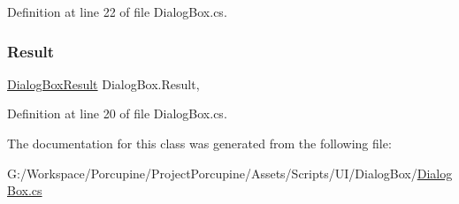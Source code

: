 Definition at line 22 of file Dialog\+Box.\+cs.

\mbox{\label{class_dialog_box_a6b1266a48b4fc7ca5d8b68b62310601d}} 
\subsubsection{\texorpdfstring{Result}{Result}}
{\footnotesize\ttfamily \hyperlink{_dialog_box_result_8cs_acd933b66f7b1c8ad36ee61780622c54f}{Dialog\+Box\+Result} Dialog\+Box.\+Result\hspace{0.3cm}{\ttfamily [get]}, {\ttfamily [set]}}



Definition at line 20 of file Dialog\+Box.\+cs.



The documentation for this class was generated from the following file\+:\begin{DoxyCompactItemize}
\item 
G\+:/\+Workspace/\+Porcupine/\+Project\+Porcupine/\+Assets/\+Scripts/\+U\+I/\+Dialog\+Box/\hyperlink{_dialog_box_8cs}{Dialog\+Box.\+cs}\end{DoxyCompactItemize}
